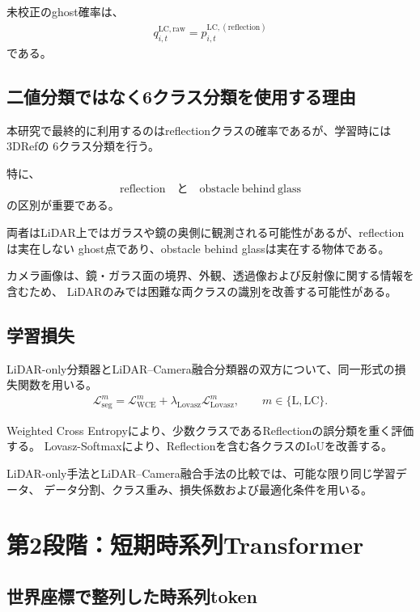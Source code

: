 \documentclass[uplatex,a4paper,11pt]{jsarticle}
\begin{document}
未校正のghost確率は、
\begin{align}
  q_{i,t}^{\mathrm{LC,raw}}
  =
  p_{i,t}^{\mathrm{LC},(\mathrm{reflection})}
\end{align}
である。

\subsection{二値分類ではなく6クラス分類を使用する理由}

本研究で最終的に利用するのはreflectionクラスの確率であるが、学習時には3DRefの
6クラス分類を行う。

特に、
\begin{align}
  \mathrm{reflection}
  \quad\text{と}\quad
  \mathrm{obstacle\ behind\ glass}
\end{align}
の区別が重要である。

両者はLiDAR上ではガラスや鏡の奥側に観測される可能性があるが、reflectionは実在しない
ghost点であり、obstacle behind glassは実在する物体である。

カメラ画像は、鏡・ガラス面の境界、外観、透過像および反射像に関する情報を含むため、
LiDARのみでは困難な両クラスの識別を改善する可能性がある。

\subsection{学習損失}

LiDAR-only分類器とLiDAR--Camera融合分類器の双方について、同一形式の損失関数を用いる。
\begin{align}
  \mathcal{L}_{\mathrm{seg}}^{m}
  =
  \mathcal{L}_{\mathrm{WCE}}^{m}
  +
  \lambda_{\mathrm{Lovasz}}
  \mathcal{L}_{\mathrm{Lovasz}}^{m},
  \qquad
  m\in\{\mathrm{L},\mathrm{LC}\}.
\end{align}

Weighted Cross Entropyにより、少数クラスであるReflectionの誤分類を重く評価する。
Lovasz-Softmaxにより、Reflectionを含む各クラスのIoUを改善する。

LiDAR-only手法とLiDAR--Camera融合手法の比較では、可能な限り同じ学習データ、
データ分割、クラス重み、損失係数および最適化条件を用いる。

\section{第2段階：短期時系列Transformer}

\subsection{世界座標で整列した時系列token}
\end{document}
